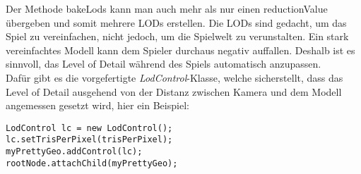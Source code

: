 Der Methode bakeLods kann man auch mehr als nur einen reductionValue übergeben und somit mehrere LODs erstellen. Die LODs sind gedacht, um das Spiel zu vereinfachen, nicht jedoch, um die Spielwelt zu verunstalten. Ein stark vereinfachtes Modell kann dem Spieler durchaus negativ auffallen. Deshalb ist es sinnvoll, das Level of Detail während des Spiels automatisch anzupassen. \\
Dafür gibt es die vorgefertigte \emph{LodControl}-Klasse, welche sicherstellt, dass das Level of Detail ausgehend von der Distanz zwischen Kamera und dem Modell angemessen gesetzt wird, hier ein Beispiel:

\begin{lstlisting}
LodControl lc = new LodControl();
lc.setTrisPerPixel(trisPerPixel);
myPrettyGeo.addControl(lc);
rootNode.attachChild(myPrettyGeo);
\end{lstlisting}
\newpage

